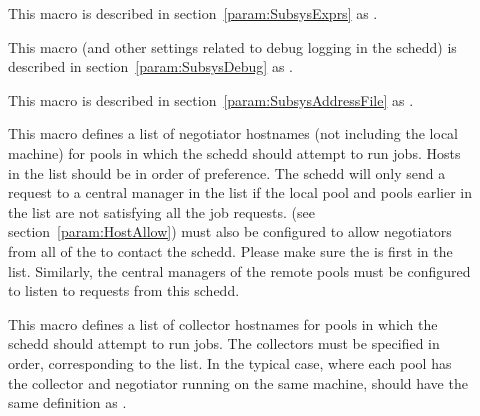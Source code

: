 \begin{description}
\item[] \label{param:ScheddExprs} This macro is
  described in section~\ref{param:SubsysExprs} as
  .

\item[] \label{param:ScheddDebug} This macro
  (and other settings related to debug logging in the schedd) is
  described in section~\ref{param:SubsysDebug} as
  .

\item[] \label{param:ScheddAddressFile}
  This macro is described in
  section~\ref{param:SubsysAddressFile} as
  . 

\item[] \label{param:FlockNegotiatorHosts} 
  This macro defines a list of negotiator hostnames (not including the
  local  machine) for pools in which the
  schedd should attempt to run jobs.  Hosts in the list should be in
  order of preference.  The schedd will only send a request to a
  central manager in the list if the local pool and pools earlier in
  the list are not satisfying all the job requests.
   (see
  section~\ref{param:HostAllow}) must also be configured to allow
  negotiators from all of the  to
  contact the schedd.  Please make sure the
   is first in the
   list.  Similarly, the
  central managers of the remote pools must be configured to listen to
  requests from this schedd.

\item[] \label{param:FLockCollectorHosts}
  This macro defines a list of collector hostnames for pools in which
  the schedd should attempt to run jobs.  The
  collectors must be specified in order, corresponding to the
   list.  In the typical case, where each pool
  has the collector and negotiator running on the same machine,
   should have the same definition as
  .



\end{description}
